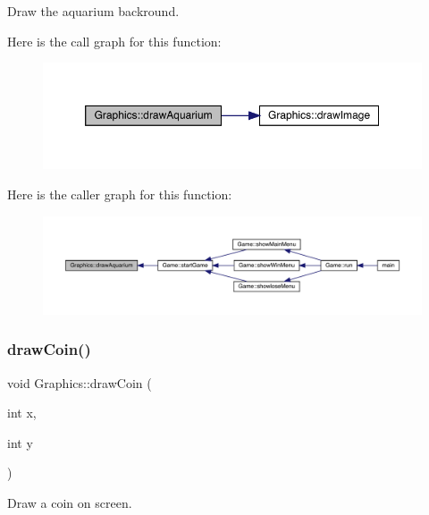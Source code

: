 Draw the aquarium backround. 

Here is the call graph for this function\+:\nopagebreak
\begin{figure}[H]
\begin{center}
\leavevmode
\includegraphics[width=350pt]{class_graphics_a5f3a657a7c54f13108bd90e6a85bd02e_cgraph}
\end{center}
\end{figure}
Here is the caller graph for this function\+:
\nopagebreak
\begin{figure}[H]
\begin{center}
\leavevmode
\includegraphics[width=350pt]{class_graphics_a5f3a657a7c54f13108bd90e6a85bd02e_icgraph}
\end{center}
\end{figure}
\mbox{\label{class_graphics_a62b98d9f52ad55e9bd8617130cfbf37b}} 
\subsubsection{\texorpdfstring{draw\+Coin()}{drawCoin()}}
{\footnotesize\ttfamily void Graphics\+::draw\+Coin (\begin{DoxyParamCaption}\item[{int}]{x,  }\item[{int}]{y }\end{DoxyParamCaption})}



Draw a coin on screen. 


